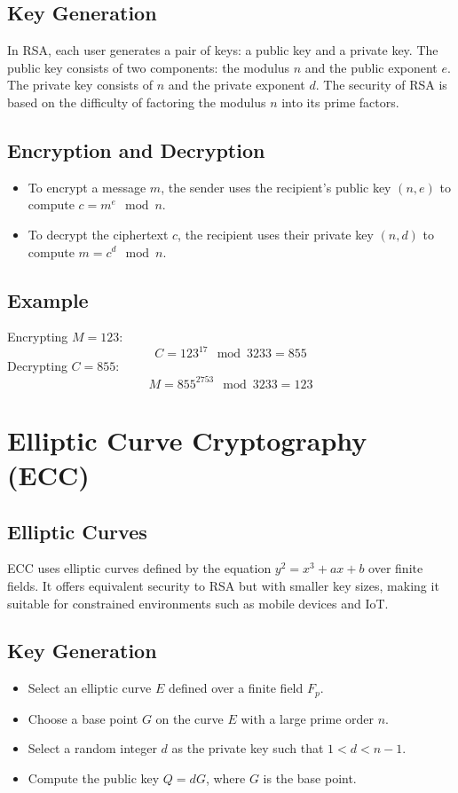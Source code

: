 \documentclass[12pt]{article}
\begin{document}
\subsection{Key Generation}
In RSA, each user generates a pair of keys: a public key and a private key. The public key consists of two components: the modulus \(n\) and the public exponent \(e\). The private key consists of \(n\) and the private exponent \(d\). The security of RSA is based on the difficulty of factoring the modulus \(n\) into its prime factors.

\subsection{Encryption and Decryption}
\begin{itemize}
    \item To encrypt a message \(m\), the sender uses the recipient’s public key \( (n, e) \) to compute \( c = m^e \mod n \).
    \item To decrypt the ciphertext \(c\), the recipient uses their private key \( (n, d) \) to compute \( m = c^d \mod n \).
\end{itemize}

\subsection{Example}
Encrypting \( M = 123 \):
\[
C = 123^{17} \mod 3233 = 855
\]
Decrypting \( C = 855 \):
\[
M = 855^{2753} \mod 3233 = 123
\]

\newpage
\section{Elliptic Curve Cryptography (ECC)}

\subsection{Elliptic Curves}
ECC uses elliptic curves defined by the equation \( y^2 = x^3 + ax + b \) over finite fields. It offers equivalent security to RSA but with smaller key sizes, making it suitable for constrained environments such as mobile devices and IoT.

\subsection{Key Generation}
\begin{itemize}
    \item Select an elliptic curve \( E \) defined over a finite field \( F_p \).
    \item Choose a base point \( G \) on the curve \( E \) with a large prime order \( n \).
    \item Select a random integer \( d \) as the private key such that \( 1 < d < n - 1 \).
    \item Compute the public key \( Q = dG \), where \( G \) is the base point.
\end{itemize}
\end{document}
